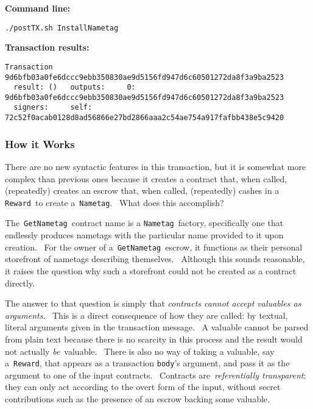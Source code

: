 \documentclass[11pt]{article}
\newcommand{\codeblock}[1]{\begin{mdframed}[
    backgroundcolor=header-color,
    linecolor=header-color,
    innertopmargin=10pt,
    ]{\texttt{#1}}\end{mdframed}}
\begin{document}
\textbf{Command line:}

\codeblock{.\slash{}postTX.sh InstallNametag}

\textbf{Transaction results:}

\codeblock{Transaction 9d6bfb03a0fe6dccc9ebb350830ae9d5156fd947d6c60501272da8f3a9ba2523\newline
  result: ()\newline
  outputs:\newline
    0: 9d6bfb03a0fe6dccc9ebb350830ae9d5156fd947d6c60501272da8f3a9ba2523\newline
  signers:\newline
    self: 72c52f0acab0128d8ad56866e27bd2866aaa2c54ae754a917fafbb438e5c9420}

\subsubsection{How it Works}
\vspace{5.5pt}

There are no new syntactic features in this transaction, but it is somewhat more complex than previous ones because it creates a contract that, when called, (repeatedly) creates an escrow that, when called, (repeatedly) cashes in a \texttt{Reward} to create a \texttt{Nametag}.  What does this accomplish?


\vspace{11pt}

The \texttt{GetNametag} contract name is a \texttt{Nametag} factory, specifically one that endlessly produces nametags with the particular name provided to it upon creation.  For the owner of a \texttt{GetNametag} escrow, it functions as their personal storefront of nametags describing themselves.  Although this sounds reasonable, it raises the question why such a storefront could not be created as a contract directly.


\vspace{11pt}

The answer to that question is simply that \textit{contracts cannot accept valuables as arguments}.  This is a direct consequence of how they are called: by textual, literal arguments given in the transaction message.  A valuable cannot be parsed from plain text because there is no scarcity in this process and the result would not actually \textit{be} valuable.  There is also no way of taking a valuable, say a \texttt{Reward}, that appears as a transaction \texttt{body}'s argument, and pass it as the argument to one of the input contracts.  Contracts are \textit{referentially transparent}: they can only act according to the overt form of the input, without secret contributions such as the presence of an escrow backing some valuable.
\end{document}
